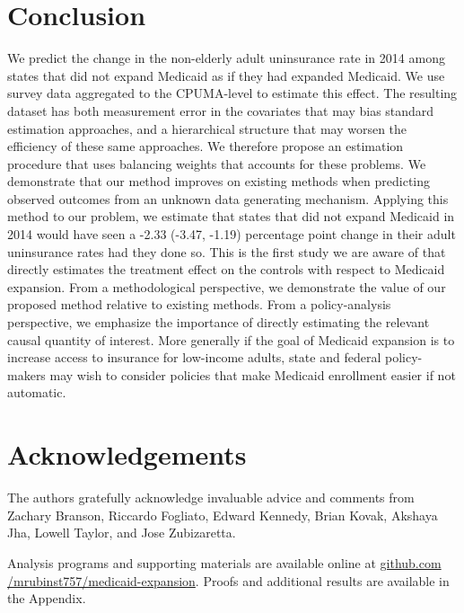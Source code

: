 \documentclass[aoas]{imsart}
\theoremstyle{plain}
\theoremstyle{remark}
\begin{document}
\section{Conclusion}

We predict the change in the non-elderly adult uninsurance rate in 2014 among states that did not expand Medicaid as if they had expanded Medicaid. We use survey data aggregated to the CPUMA-level to estimate this effect. The resulting dataset has both measurement error in the covariates that may bias standard estimation approaches, and a hierarchical structure that may worsen the efficiency of these same approaches. We therefore propose an estimation procedure that uses balancing weights that accounts for these problems. We demonstrate that our method improves on existing methods when predicting observed outcomes from an unknown data generating mechanism. Applying this method to our problem, we estimate that states that did not expand Medicaid in 2014 would have seen a -2.33 (-3.47, -1.19) percentage point change in their adult uninsurance rates had they done so. This is the first study we are aware of that directly estimates the treatment effect on the controls with respect to Medicaid expansion. From a methodological perspective, we demonstrate the value of our proposed method relative to existing methods. From a policy-analysis perspective, we emphasize the importance of directly estimating the relevant causal quantity of interest. More generally if the goal of Medicaid expansion is to increase access to insurance for low-income adults, state and federal policy-makers may wish to consider policies that make Medicaid enrollment easier if not automatic.

\section*{Acknowledgements}

The authors gratefully acknowledge invaluable advice and comments from Zachary Branson, Riccardo Fogliato, Edward Kennedy, Brian Kovak, Akshaya Jha, Lowell Taylor, and Jose Zubizaretta.

\begin{supplement}
Analysis programs and supporting materials are available online at \url{github.com /mrubinst757/medicaid-expansion}. Proofs and additional results are available in the Appendix.
\end{supplement}

\end{document}
